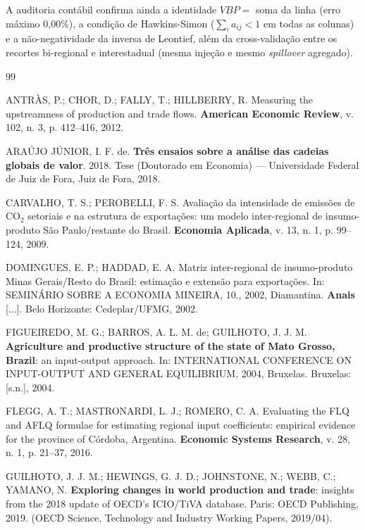 \documentclass[11pt,a4paper]{article}
\begin{document}
A auditoria contábil confirma ainda a identidade $VBP = $ soma da linha
(erro máximo 0,00\%), a condição de Hawkins-Simon ($\sum_i a_{ij} < 1$ em todas
as colunas) e a não-negatividade da inversa de Leontief, além da
cross-validação entre os recortes bi-regional e interestadual (mesma injeção e
mesmo \emph{spillover} agregado).

\begin{thebibliography}{99}

ANTRÀS, P.; CHOR, D.; FALLY, T.; HILLBERRY, R. Measuring the upstreamness of
production and trade flows. \textbf{American Economic Review}, v. 102, n. 3,
p. 412--416, 2012.

ARAÚJO JÚNIOR, I. F. de. \textbf{Três ensaios sobre a análise das cadeias
globais de valor}. 2018. Tese (Doutorado em Economia) --- Universidade Federal
de Juiz de Fora, Juiz de Fora, 2018.

CARVALHO, T. S.; PEROBELLI, F. S. Avaliação da intensidade de emissões de
CO$_2$ setoriais e na estrutura de exportações: um modelo inter-regional de
insumo-produto São Paulo/restante do Brasil. \textbf{Economia Aplicada},
v. 13, n. 1, p. 99--124, 2009.

DOMINGUES, E. P.; HADDAD, E. A. Matriz inter-regional de insumo-produto Minas
Gerais/Resto do Brasil: estimação e extensão para exportações. In: SEMINÁRIO
SOBRE A ECONOMIA MINEIRA, 10., 2002, Diamantina. \textbf{Anais} [...].
Belo Horizonte: Cedeplar/UFMG, 2002.

FIGUEIREDO, M. G.; BARROS, A. L. M. de; GUILHOTO, J. J. M. \textbf{Agriculture
and productive structure of the state of Mato Grosso, Brazil}: an input-output
approach. In: INTERNATIONAL CONFERENCE ON INPUT-OUTPUT AND GENERAL EQUILIBRIUM,
2004, Bruxelas. Bruxelas: [s.n.], 2004.

FLEGG, A. T.; MASTRONARDI, L. J.; ROMERO, C. A. Evaluating the FLQ and AFLQ
formulae for estimating regional input coefficients: empirical evidence for the
province of Córdoba, Argentina. \textbf{Economic Systems Research}, v. 28,
n. 1, p. 21--37, 2016.

GUILHOTO, J. J. M.; HEWINGS, G. J. D.; JOHNSTONE, N.; WEBB, C.; YAMANO, N.
\textbf{Exploring changes in world production and trade}: insights from the
2018 update of OECD's ICIO/TiVA database. Paris: OECD Publishing, 2019.
(OECD Science, Technology and Industry Working Papers, 2019/04).


\end{thebibliography}
\end{document}
